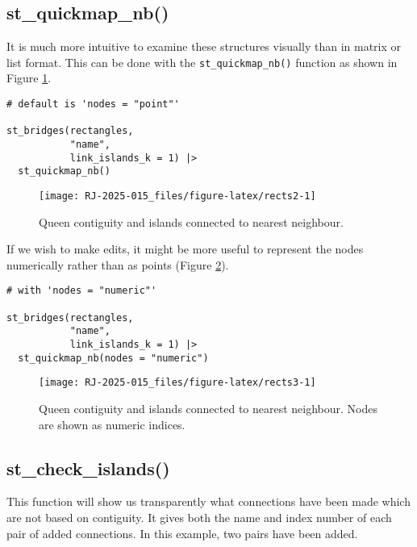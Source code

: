 \subsection{st\_quickmap\_nb()}\label{st_quickmap_nb}

It is much more intuitive to examine these structures visually than in
matrix or list format. This can be done with the \texttt{st\_quickmap\_nb()}
function as shown in Figure \ref{fig:rects2}.

\begin{verbatim}
# default is 'nodes = "point"'

st_bridges(rectangles,
           "name",
           link_islands_k = 1) |>
  st_quickmap_nb()
\end{verbatim}

\begin{figure}

{\centering \texttt{[image: RJ-2025-015\_files/figure-latex/rects2-1]} 

}

\caption{Queen contiguity and islands connected to nearest neighbour. }\label{fig:rects2}
\end{figure}

If we wish to make edits, it might be more useful to represent the nodes
numerically rather than as points (Figure \ref{fig:rects3}).

\begin{verbatim}
# with 'nodes = "numeric"'

st_bridges(rectangles,
           "name",
           link_islands_k = 1) |>
  st_quickmap_nb(nodes = "numeric")
\end{verbatim}

\begin{figure}

{\centering \texttt{[image: RJ-2025-015\_files/figure-latex/rects3-1]} 

}

\caption{Queen contiguity and islands connected to nearest neighbour. Nodes are shown as numeric indices. }\label{fig:rects3}
\end{figure}

\subsection{st\_check\_islands()}\label{st_check_islands}

This function will show us transparently what connections have been made which
are not based on contiguity. It gives both the name and index number of each pair of added connections. In this example, two pairs have been added.

